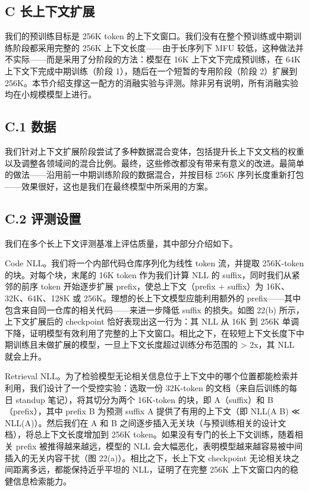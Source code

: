\subsection{C 长上下文扩展}\label{c-long-context-extension}

我们的预训练目标是 256K token 的上下文窗口。我们没有在整个预训练或中期训练阶段都采用完整的 256K 上下文长度——由于长序列下 MFU 较低，这种做法并不实际——而是采用了分阶段的方法：模型在 16K 上下文下完成预训练，在 64K 上下文下完成中期训练（阶段 1），随后在一个短暂的专用阶段（阶段 2）扩展到 256K。本节介绍支撑这一配方的消融实验与评测。除非另有说明，所有消融实验均在小规模模型上进行。



\subsection{C.1 数据}\label{c.1-data}

我们针对上下文扩展阶段尝试了多种数据混合变体，包括提升长上下文文档的权重以及调整各领域间的混合比例。最终，这些修改都没有带来有意义的改进。最简单的做法——沿用前一中期训练阶段的数据混合，并按目标 256K 序列长度重新打包——效果很好，这也是我们在最终模型中所采用的方案。

\subsection{C.2 评测设置}\label{c.2-evaluation-setup}

我们在多个长上下文评测基准上评估质量，其中部分介绍如下。

Code NLL。我们将一个内部代码仓库序列化为线性 token 流，并提取 256K-token 的块。对每个块，末尾的 16K token 作为我们计算 NLL 的 suffix，同时我们从紧邻的前序 token 开始逐步扩展 prefix，使总上下文（prefix + suffix）为 16K、32K、64K、128K 或 256K。理想的长上下文模型应能利用额外的 prefix——其中包含来自同一仓库的相关代码——来进一步降低 suffix 的损失。如图 22(b) 所示，上下文扩展后的 checkpoint 恰好表现出这一行为：其 NLL 从 16K 到 256K 单调下降，证明模型有效利用了完整的上下文窗口。相比之下，在较短上下文长度下中期训练且未做扩展的模型，一旦上下文长度超过训练分布范围的 \textgreater{} 2x，其 NLL 就会上升。

Retrieval NLL。为了检验模型无论相关信息位于上下文中的哪个位置都能检索并利用，我们设计了一个受控实验：选取一份 32K-token 的文档（来自后训练的每日 standup 笔记），将其切分为两个 16K-token 的块，即 A（suffix）和 B（prefix），其中 prefix B 为预测 suffix A 提供了有用的上下文（即 NLL(A \textbar{} B) ≪ NLL(A)）。然后我们在 A 和 B 之间逐步插入无关块（与预训练相关的设计文档），将总上下文长度增加到 256K token。如果没有专门的长上下文训练，随着相关 prefix 被推得越来越远，模型的 NLL 会大幅恶化，表明模型越来越容易被中间插入的无关内容干扰（图 22(a)）。相比之下，长上下文 checkpoint 无论相关块之间距离多远，都能保持近乎平坦的 NLL，证明了在完整 256K 上下文窗口内的稳健信息检索能力。

